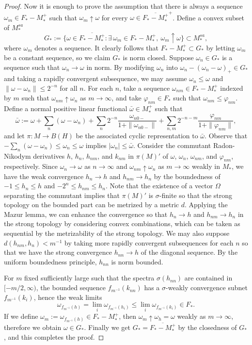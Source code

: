\documentclass[a4paper]{amsart}
\theoremstyle{plain}
\theoremstyle{definition}
\begin{document}
\begin{proof}
Now it is enough to prove the assumption that there is always a sequence $\omega_m\in F_*-M_*^+$ such that $\omega_m\uparrow\omega$ for every $\omega\in\overline{F_*-M_*^+}^+$.
Define a convex subset of $M_*^{sa}$
\[G_*:=\{\omega\in\overline{F_*-M_*^+}:\exists\,\omega_m\in F_*-M_*^+,\ \omega_m\uparrow\omega\}\subset M_*^{sa},\]
where $\omega_m$ denotes a sequence.
It clearly follows that $F_*-M_*^+\subset G_*$ by letting $\omega_m$ be a constant sequence, so we claim $G_*$ is norm closed.
Suppose $\omega_n\in G_*$ is a sequence such that $\omega_n\to\omega$ in norm.
By modifying $\omega_n$ into $\omega_n-(\omega_n-\omega)_+\in G_*$ and taking a rapidly convergent subsequence, we may assume $\omega_n\le\omega$ and $\|\omega-\omega_n\|\le2^{-n}$ for all $n$.
For each $n$, take a sequence $\omega_{nm}\in F_*-M_*^+$ indexed by $m$ such that $\omega_{nm}\uparrow\omega_n$ as $m\to\infty$, and take $\varphi_{nm}\in F_*$ such that $\omega_{nm}\le\varphi_{nm}$.
Define a normal positive linear functional $\bar\omega\in M_*^+$ such that
\[\bar\omega:=\omega+\sum_n(\omega-\omega_n)+\sum_n2^{-n}\frac{\omega_{n0-}}{1+\|\omega_{n0-}\|}+\sum_{n,m}2^{-n-m}\frac{\varphi_{nm}}{1+\|\varphi_{nm}\|},\]
and let $\pi:M\to B(H)$ be the associated cyclic representation to $\bar\omega$.
Observe that $-\sum_n(\omega-\omega_n)\le\omega_n\le\omega$ implies $|\omega_n|\le\bar\omega$.
Consider the commutant Radon-Nikodym derivatives $h$, $h_n$, $h_{nm}$, and $k_{nm}$ in $\pi(M)'$ of $\omega$, $\omega_n$, $\omega_{nm}$, and $\varphi_{nm}$, respectively.
Since $\omega_n\to\omega$ as $n\to\infty$ and $\omega_{nm}\uparrow\omega_n$ as $m\to\infty$ weakly in $M_*$, we have the weak convergence $h_n\to h$ and $h_{nm}\to h_n$ by the boundedness of $-1\le h_n\le h$ and $-2^n\le h_{nm}\le h_n$.
Note that the existence of a vector $\Omega$ separating the commutant implies that $\pi(M)'$ is $\sigma$-finite so that the strong topology on the bounded part can be metrized by a metric $d$.
Applying the Mazur lemma, we can enhance the convergence so that $h_n\to h$ and $h_{nm}\to h_n$ in the strong topology by considering convex combinations, which can be taken as sequential by the metrizability of the strong topology.
We may also suppose $d(h_{nm},h_n)<m^{-1}$ by taking more rapidly convergent subsequences for each $n$ so that we have the strong convergence $h_{nn}\to h$ of the diagonal sequence.
By the uniform boundedness principle, $h_{nn}$ is norm bounded.

For $m$ fixed sufficiently large such that the spectra $\sigma(h_{nn})$ are contained in $[-m/2,\infty)$, the bounded sequence $f_{m^{-1}}(k_{nn})$ has a $\sigma$-weakly convergence subnet $f_{m^{-1}}(k_i)$, hence the weak limits
\[\omega_{f_{m^{-1}}(h)}=\lim_i\omega_{f_{m^{-1}}(h_i)}\le\lim_i\omega_{f_{m^{-1}}(k_i)}\in F_*.\]
If we define $\omega_m:=\omega_{f_{m^{-1}}(h)}\in F_*-M_*^+$, then $\omega_m\uparrow\omega_h=\omega$ weakly as $m\to\infty$, therefore we obtain $\omega\in G_*$.
Finally we get $G_*=\overline{F_*-M_*^+}$ by the closedness of $G_*$, and this completes the proof.
\end{proof}
\end{document}
